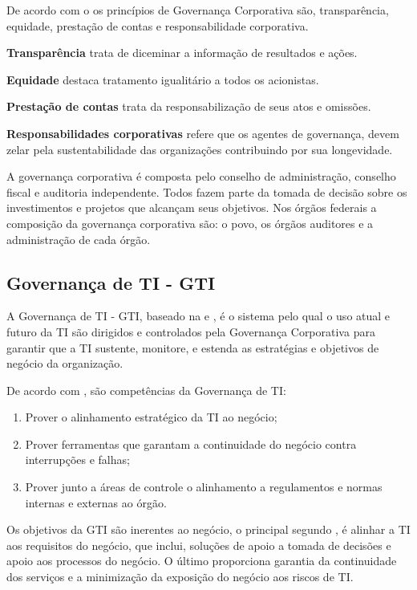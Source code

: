 De acordo com o \cite{IBGC} os princípios de Governança Corporativa são, transparência, equidade, prestação de contas e responsabilidade corporativa.

\textbf{Transparência} trata de diceminar a informação de resultados e ações. 

\textbf{Equidade} destaca tratamento igualitário a todos os acionistas. 

\textbf{Prestação de contas} trata da responsabilização de seus atos e omissões. 

\textbf{Responsabilidades corporativas} refere que os agentes de governança, devem zelar pela sustentabilidade das organizações contribuindo por sua longevidade.

A governança corporativa é composta pelo conselho de administração, conselho fiscal e auditoria independente. Todos fazem parte da tomada de decisão sobre os investimentos e projetos que alcançam seus objetivos. Nos órgãos federais a composição da governança corporativa são: o povo, os órgãos auditores e a administração de cada órgão.

	
\subsection{Governança de TI - GTI} \label{sec:govti}

A Governança de TI - GTI, baseado na \cite{GTI:TCU} e \cite{ImplantandoGTI:2012}, é o sistema pelo qual o uso atual e futuro da TI são dirigidos e controlados pela Governança Corporativa para garantir que a TI sustente, monitore, e estenda as estratégias e objetivos de negócio da organização. 

De acordo com \cite{ImplantandoGTI:2012}, são competências da Governança de TI: 

\begin{enumerate}
\item Prover o alinhamento estratégico da TI ao negócio;
\item Prover ferramentas que garantam a continuidade do negócio contra interrupções e falhas;
\item Prover junto a áreas de controle o alinhamento a regulamentos e normas internas e externas ao órgão.

\end{enumerate}

Os objetivos da GTI são inerentes ao negócio, o principal segundo \cite{ImplantandoGTI:2012}, é alinhar a TI aos requisitos do negócio, que inclui, soluções de apoio a tomada de decisões e apoio aos processos do negócio. O último proporciona garantia da continuidade dos serviços e a minimização da exposição do negócio aos riscos de TI. 

